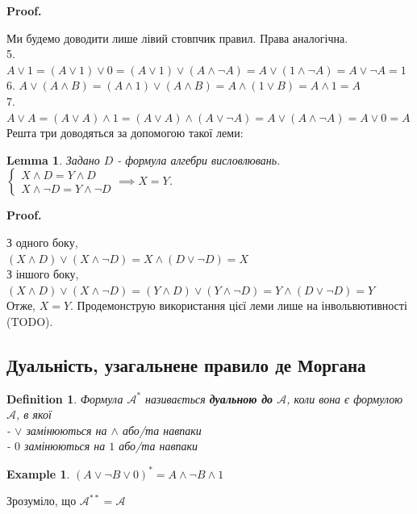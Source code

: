 \documentclass[a4paper, 14pt]{extarticle}
\makeatletter
\theoremstyle{theoremdd}
\theoremstyle{theoremdd}
\newtheorem{definition}[theorem]{Definition}
\theoremstyle{theoremdd}
\theoremstyle{theoremdd}
\theoremstyle{theoremdd}
\newtheorem{example}[theorem]{Example}
\theoremstyle{theoremdd}
\theoremstyle{theoremdd}
\theoremstyle{theoremdd}
\theoremstyle{theoremdd}
\theoremstyle{theoremdd}
\theoremstyle{theoremdd}
\theoremstyle{theoremdd}
\theoremstyle{theoremdd}
\newtheorem{lemma}[theorem]{Lemma}
\theoremstyle{theoremdd}
\theoremstyle{theoremdd}
\renewenvironment{proof}[1][Proof.\\]{\par
\pushQED{\hfill \qed}%
\normalfont \topsep6\p@\@plus6\p@\relax
\trivlist
\item\relax
{\bfseries
#1\@addpunct{.}}\hspace\labelsep\ignorespaces
}{%
\popQED\endtrivlist\@endpefalse
}
\makeatother
\begin{document}
\begin{proof}
Ми будемо доводити лише лівий стовпчик правил. Права аналогічна.\\
5. $A \vee 1 = (A \vee 1) \vee 0 = (A \vee 1) \vee (A \wedge \neg A) = A \vee (1 \wedge \neg A) = A \vee \neg A = 1$
\bigskip \\
6. $A \vee (A \wedge B) = (A \wedge 1) \vee (A \wedge B) = A \wedge (1 \vee B) = A \wedge 1 = A$
\bigskip \\
7. $A \vee A = (A \vee A) \wedge 1 = (A \vee A) \wedge (A \vee \neg A) = A \vee (A \wedge \neg A) = A \vee 0 = A$
\bigskip \\
Решта три доводяться за допомогою такої леми:
\begin{lemma}
Задано $D$ - формула алгебри висловлювань.\\
$\begin{cases} X \wedge D = Y \wedge D \\ X \wedge \neg D = Y \wedge \neg D \end{cases} \implies X = Y$.
\end{lemma}

\begin{proof}
З одного боку,\\
$(X \wedge D) \vee (X \wedge \neg D) = X \wedge (D \vee \neg D) = X$\\
З іншого боку,\\
$(X \wedge D) \vee (X \wedge \neg D) = (Y \wedge D) \vee (Y \wedge \neg D) = Y \wedge (D \vee \neg D) = Y$\\
Отже, $X=Y$.
\end{proof}
Продемонструю використання цієї леми лише на інвольвютивності (TODO).
\end{proof}

\subsection{Дуальність, узагальнене правило де Моргана}
\begin{definition}
Формула $\mathcal{A}^*$ називається \textbf{дуальною до} $\mathcal{A}$, коли вона є формулою $\mathcal{A}$, в якої\\
- $\vee$ замінюються на $\wedge$ або/та навпаки\\
- $0$ замінюються на $1$ або/та навпаки
\end{definition}

\begin{example}
$(A \vee \neg B \vee 0)^* = A \wedge \neg B \wedge 1$
\end{example}
Зрозуміло, що $\mathcal{A}^{**} = \mathcal{A}$
\end{document}
